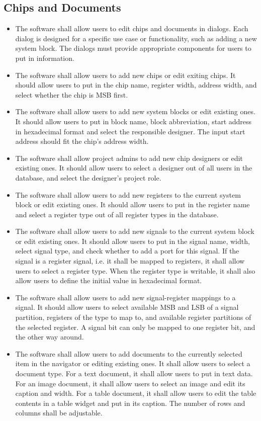 \subsection{Chips and Documents}
\begin{itemize}
\item The software shall allow users to edit chips and documents in dialogs. Each dialog is designed for a specific use case or functionality, such as adding a new system block. The dialogs must provide appropriate components for users to put in information.
\item The software shall allow users to add new chips or edit exiting chips. It should allow users to put in the chip name, register width, address width, and select whether the chip is MSB first.
\item The software shall allow users to add new system blocks or edit existing ones. It should allow users to put in block name, block abbreviation, start address in hexadecimal format and select the responsible designer. The input start address should fit the chip's address width.
\item The software shall allow project admins to add new chip designers or edit existing ones. It should allow users to select a designer out of all users in the database, and select the designer's project role.
\item The software shall allow users to add new registers to the current system block or edit existing ones. It should allow users to put in the register name and select a register type out of all register types in the database.
\item The software shall allow users to add new signals to the current system block or edit existing ones. It should allow users to put in the signal name, width, select signal type, and check whether to add a port for this signal. If the signal is a register signal, i.e. it shall be mapped to registers, it shall allow users to select a register type. When the register type is writable, it shall also allow users to define the initial value in hexadecimal format.
\item The software shall allow users to add new signal-register mappings to a signal. It should allow users to select available MSB and LSB of a signal partition, registers of the type to map to, and available register partitions of the selected register. A signal bit can only be mapped to one register bit, and the other way around. 
\item The software shall allow users to add documents to the currently selected item in the navigator or editing existing ones. It shall allow users to select a document type. For a text document, it shall allow users to put in text data. For an image document, it shall allow users to select an image and edit its caption and width. For a table document, it shall allow users to edit the table contents in a table widget and put in its caption. The number of rows and columns shall be adjustable.

\end{itemize}
